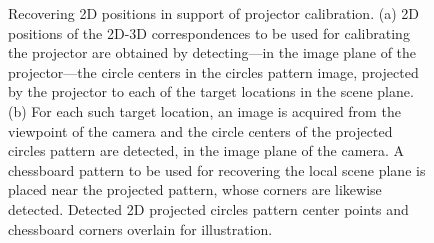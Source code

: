 \documentclass[review]{elsarticle}
\begin{document}
\begin{figure}
    \centering
    \qquad
    \caption{Recovering 2D positions in support of projector calibration. (a) 2D positions of the 2D-3D correspondences to be used for calibrating the projector are obtained by detecting---in the image plane of the projector---the circle centers in the circles pattern image, projected by the projector to each of the target locations in the scene plane. (b) For each such target location, an image is acquired from the viewpoint of the camera and the circle centers of the projected circles pattern are detected, in the image plane of the camera. A chessboard pattern to be used for recovering the local scene plane is placed near the projected pattern, whose corners are likewise detected. Detected 2D projected circles pattern center points and chessboard corners overlain for illustration.}
    \label{fig:2d}
\end{figure}
\end{document}
